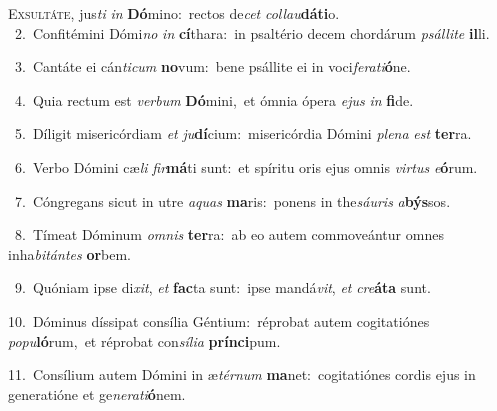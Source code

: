 \lettrine{\initial\textcolor{\initialcolor}{E}}{xsultáte,} jus\textit{ti} \textit{in} \textbf{Dó}\-mino:~\star rectos de\textit{cet} \textit{col}\-\textit{lau}\textbf{dá}\textbf{ti}o.\\
{\numbfont\textcolor{\numbcolor}{~2.}}~Confitémini Dómi\textit{no} \textit{in} \textbf{cí}\-thara:~\star in psaltério decem chordárum \textit{psál}\-\textit{li}\textit{te} \textbf{il}\-li.\par
{\numbfont\textcolor{\numbcolor}{~3.}}~Cantáte ei cán\-\textit{ti}\-\textit{cum} \textbf{no}\-vum:~\star bene psállite ei in voci\-\textit{fe}\-\textit{ra}\textit{ti}\textbf{ó}ne.\par
{\numbfont\textcolor{\numbcolor}{~4.}}~Quia rectum est \textit{ver}\-\textit{bum} \textbf{Dó}\-mini,~\star et ómnia ópera \textit{e}\-\textit{jus} \textit{in} \textbf{fi}\-de.\par
{\numbfont\textcolor{\numbcolor}{~5.}}~Díligit misericórdiam \textit{et} \textit{ju}\-\textbf{dí}cium:~\star misericórdia Dómini \textit{ple}\-\textit{na} \textit{est} \textbf{ter}\-ra.\par
{\numbfont\textcolor{\numbcolor}{~6.}}~Verbo Dómini cæ\textit{li} \textit{fir}\-\textbf{má}ti sunt:~\star et spíritu oris ejus omnis \textit{vir}\-\textit{tus} \textit{e}\-\textbf{ó}rum.\par
{\numbfont\textcolor{\numbcolor}{~7.}}~Cóngregans sicut in utre \textit{a}\-\textit{quas} \textbf{ma}\-ris:~\star ponens in the\-\textit{sáu}\-\textit{ris} \textit{a}\-\textbf{býs}sos.\par
{\numbfont\textcolor{\numbcolor}{~8.}}~Tímeat Dóminum \textit{om}\-\textit{nis} \textbf{ter}\-ra:~\star ab eo autem commoveántur omnes inha\-\textit{bi}\-\textit{tán}\textit{tes} \textbf{or}\-bem.\par
{\numbfont\textcolor{\numbcolor}{~9.}}~Quóniam ipse di\-\textit{xit}\-, \textit{et} \textbf{fac}\-ta sunt:~\star ipse mandá\-\textit{vit}\-, \textit{et} \textit{cre}\-\textbf{á}\textbf{ta} sunt.\par
{\numbfont\textcolor{\numbcolor}{10.}}~Dóminus díssipat consília Géntium:~\dagger réprobat autem cogitatiónes \textit{po}\-\textit{pu}\textbf{ló}rum,~\star et réprobat con\-\textit{sí}\-\textit{li}\textit{a} \textbf{prín}\-\textbf{ci}pum.\par
{\numbfont\textcolor{\numbcolor}{11.}}~Consílium autem Dómini in æ\-\textit{tér}\-\textit{num} \textbf{ma}\-net:~\star cogitatiónes cordis ejus in generatióne et ge\-\textit{ne}\-\textit{ra}\textit{ti}\textbf{ó}nem.\par
